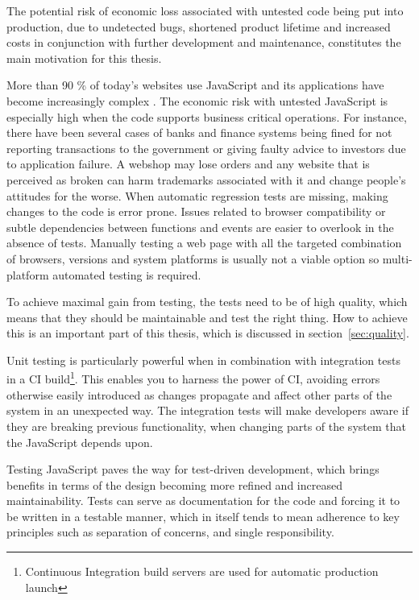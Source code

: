 \documentclass[11pt]{article}
\begin{document}
The potential risk of economic loss associated with untested code being put into production, due to undetected bugs, shortened product lifetime and increased costs in conjunction with further development and maintenance, constitutes the main motivation for this thesis.

More than 90 \% of today's websites use JavaScript\cite{BusinessJavascript} and its applications have become increasingly complex \cite[question~23]{Ekelof}. The economic risk with untested JavaScript is especially high when the code supports business critical operations. For instance, there have been several cases of banks and finance systems being fined for not reporting transactions to the government\cite{Bug1} or giving faulty advice to investors\cite{Bug2} due to application failure. A webshop may lose orders and any website that is perceived as broken can harm trademarks associated with it and change people's attitudes for the worse. When automatic regression tests are missing, making changes to the code is error prone. Issues related to browser compatibility or subtle dependencies between functions and events are easier to overlook in the absence of tests. Manually testing a web page with all the targeted combination of browsers, versions and system platforms is usually not a viable option\cite{TestSwarm} so multi-platform automated testing is required.

To achieve maximal gain from testing, the tests need to be of high quality, which means that they should be maintainable and test the right thing. How to achieve this is an important part of this thesis, which is discussed in section~\ref{sec:quality}.

Unit testing is particularly powerful when in combination with integration tests in a CI build\footnote{Continuous Integration build servers are used for automatic production launch}. This enables you to harness the power of CI, avoiding errors otherwise easily introduced as changes propagate and affect other parts of the system in an unexpected way. The integration tests will make developers aware if they are breaking previous functionality, when changing parts of the system that the JavaScript depends upon.

Testing JavaScript paves the way for test-driven development, which brings benefits in terms of the design becoming more refined and increased maintainability. Tests can serve as documentation for the code and forcing it to be written in a testable manner, which in itself tends to mean adherence to key principles such as separation of concerns, and single responsibility.
\end{document}
